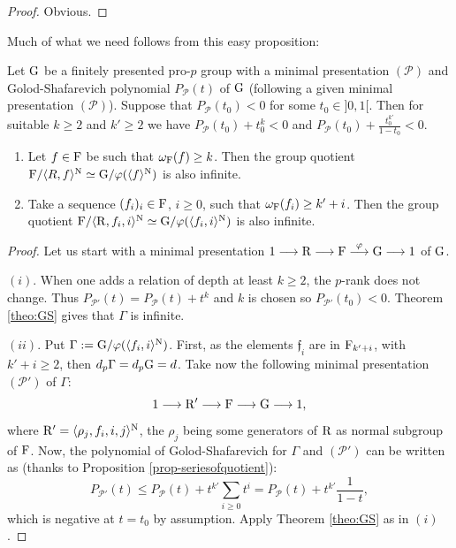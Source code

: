 \documentclass[12pt,a4paper,twoside,english]{smfart}
\def\f{{\mathfrak f}}
\def\N{{\rm N}}
\def\R{{\rm R}}
\def\G{{\rm G}}
\def\F{{\rm F}}
\def\PP{{\mathcal P}}
\begin{document}
\begin{proof}
Obvious.
\end{proof}  
  
Much of what we need follows from this easy proposition:

\begin{prop} \label{prop:cutting}
Let $\G$ be a finitely presented
 pro-$p$ group with a minimal presentation $(\PP)$ and 
 Golod-Shafarevich polynomial  $P_\PP(t)$ of $\G$ (following a given minimal presentation $(\PP)$).  Suppose that  $P_\PP(t_0) <0$ for  some $t_0 \in ]0,1[$. 
Then for suitable $k \geq 2$ and $k' \geq 2$ we have $P_\PP(t_0) +t^k_0 <0$ and $\displaystyle P_\PP(t_0) +\frac{t^{k'}_0}{1-t_0} <0$.



\begin{enumerate}
\item[$(i)$] Let $\f \in \F$ be such that $\omega_\F(\f) \geq k$. Then the group quotient 
$\F/\langle R,\f \rangle^\N \simeq   \G/\varphi(\langle \f \rangle^{\rm N})$ is also infinite.
\item[$(ii)$] Take a sequence $(\f_i)_i \in \F$, $i\geq 0$, such that $\omega_\F(\f_i) \geq k'+i$. Then the group quotient 
$\F/\langle \R, \f_i, i \rangle^{\rm N}  \simeq \G/\varphi(\langle \f_i, i \rangle^{\rm N})  $ is also infinite.

\end{enumerate}
\end{prop}  

\begin{proof} Let us  start with a minimal presentation $1\longrightarrow \R \longrightarrow \F \stackrel{\varphi}{\longrightarrow} \G \longrightarrow 1$ of $\G$.

$(i)$. When one adds a relation of depth at least $k\geq 2$,  the $p$-rank does not change. 
Thus $P_{\PP'}(t)=P_\PP(t) + t^k $ and $k$ is chosen so $P_{\PP'}(t_0)<0$.
Theorem \ref{theo:GS} gives that $\Gamma$ is infinite.


$(ii)$.  Put $\Gamma:= \G/\varphi(\langle \f_i, i \rangle^{\rm N})$.  First, as the elements $\f_i$ are in $\F_{k'+i}$, with $k'+i\geq 2$, then $d_p \Gamma=d_p \G=d$.
Take now  the following minimal presentation $(\PP')$ of $\Gamma$: $$1\longrightarrow \R' \longrightarrow \F \longrightarrow \G \longrightarrow 1,$$ where $\R'=\langle \rho_j, \f_i, i,j \rangle^{\rm N}$, the $\rho_j$ being some generators of $\R$ as normal subgroup of $\F$. Now, the polynomial  of Golod-Shafarevich for $\Gamma$ and $(\PP')$ can be written as (thanks to Proposition \ref{prop-seriesofquotient}):
 $$P_{\PP'}(t) \leq P_\PP(t) + t^{k'} \sum_{i\geq 0} t^{i}=P_\PP(t) +t^{k'} \frac{1}{1-t},$$ which is negative at $t=t_0$ by assumption.  
 Apply Theorem \ref{theo:GS} as in $(i)$.%
 \end{proof}
  
\end{document}
